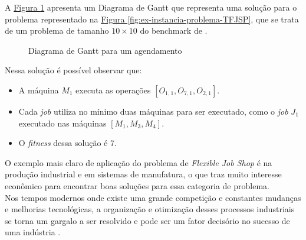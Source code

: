 \indent A
\hyperref[fig:plot-gantt]{Figura \ref{fig:plot-gantt}} 
apresenta um Diagrama de Gantt que representa uma solução para o problema representado na 
\hyperref[fig:ex-instancia-problema-TFJSP]{Figura \ref{fig:ex-instancia-problema-TFJSP}}, 
que se trata de um problema de tamanho $10\times10$ do benchmark de  \cite{Kacem2002}.\\
\begin{figure}[ht]
    \centering
    \caption{Diagrama de Gantt para um agendamento}
    \label{fig:plot-gantt}
    \resizebox{\textwidth}{!}{}
\end{figure}
\noindent Nessa solução é possível observar que:
\begin{itemize}
    \item A máquina $M_1$ executa as operações $[O_{1,1}, O_{7,1}, O_{2,1}]$.
    \item Cada \textit{job} utiliza no mínimo duas máquinas para ser executado, como o \textit{job} $J_1$ executado nas máquinas $[M_1 , M_3, M_4]$.
    \item O \textit{fitness} dessa solução é $7$.
\end{itemize}
\indent O exemplo mais claro de aplicação do problema de \textit{Flexible Job Shop} é na produção industrial e em sistemas de manufatura, o que traz muito interesse econômico para encontrar boas soluções para essa categoria de problema.\\
%
\indent Nos tempos modernos onde existe uma grande competição e constantes mudanças e melhorias tecnológicas, a organização e otimização desses processos industriais se torna um gargalo a ser resolvido e pode ser um fator decisório no sucesso de uma indústria \cite{Wari2016}.
